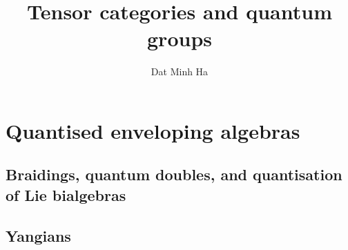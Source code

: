 

\setcounter{chapter}{-1}
\setcounter{section}{-1}





	\title{Tensor categories and quantum groups}
	
	\author{Dat Minh Ha}
	\maketitle
	
	\begin{abstract}
	    
	\end{abstract}
	
	{
      \hypersetup{} 
      \dominitoc
      \tableofcontents %
    }
    
    
    
    \part{Quantised enveloping algebras}
        \chapter{Braidings, quantum doubles, and quantisation of Lie bialgebras}
            \begin{abstract}
            
            \end{abstract}
            
            \minitoc
        
            

        \chapter{Yangians}
            \begin{abstract}
            
            \end{abstract}
            
            \minitoc
    
